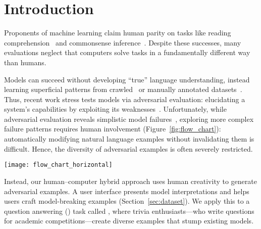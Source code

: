 \section{Introduction}
\label{sec:introduction}

Proponents of machine learning claim human
parity on tasks like reading comprehension~\cite{yu2018qanet}
and commonsense
inference~\cite{devlin2018BERT}. Despite these successes,
many evaluations neglect that computers solve  tasks 
in a fundamentally different way than humans.  

Models can succeed without developing ``true'' language understanding,
instead learning superficial patterns from
crawled~\cite{chen2016thorough} or manually annotated
datasets~\cite{kaushik2018reading,gururangan2018annotation}.  Thus,
recent work stress tests models via adversarial evaluation:
elucidating a system's capabilities by exploiting its
weaknesses~\cite{jia2017adversarial,belinkov2019survey}.
Unfortunately, while adversarial evaluation reveals simplistic model
failures~\cite{ribeiro2018sear,mudrakarta2018understand}, exploring
more complex failure patterns requires human involvement (Figure~\ref{fig:flow_chart}):
automatically modifying natural language examples
without invalidating them is difficult. Hence, the diversity
of adversarial examples is often severely restricted.
	
\begin{figure*}[t]
\centering
\texttt{[image: flow\_chart\_horizontal]}
\caption{Adversarial evaluation in  typically focuses on a specific
  phenomenon (e.g., word replacements) and then generates the corresponding examples (top).
  Consequently, adversarial examples are limited to
  the diversity of what the underlying generative model or perturbation rule can produce and also require downstream
  human evaluation to ensure validity. Our setup (bottom) instead has
  human-authored examples, using human--computer collaboration to craft adversarial examples with greater diversity.}
\label{fig:flow_chart}
\end{figure*}

Instead, our human--computer hybrid approach uses human creativity to
generate adversarial examples.  A user interface presents model
interpretations and helps users craft model-breaking examples
(Section~\ref{sec:dataset}).  We apply this to a question answering
() task called \qb{}, where trivia enthusiasts---who write
questions for academic competitions---create diverse examples
that stump existing  models.

